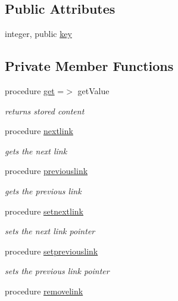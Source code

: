 \subsection*{Public Attributes}
\begin{DoxyCompactItemize}
\item 
integer, public \mbox{\hyperlink{structlink__mod_1_1link_a3f4862b7d40b8f01c7c65f85d1a567ef}{key}}
\end{DoxyCompactItemize}
\subsection*{Private Member Functions}
\begin{DoxyCompactItemize}
\item 
procedure \mbox{\hyperlink{structlink__mod_1_1link_ae93e1e4945ec20b860a1395707f5a3c2}{get}} =$>$ get\+Value
\begin{DoxyCompactList}\small\item\em returns stored content \end{DoxyCompactList}\item 
procedure \mbox{\hyperlink{structlink__mod_1_1link_adca80dab61624ba43b5069fca5cf7427}{nextlink}}
\begin{DoxyCompactList}\small\item\em gets the next link \end{DoxyCompactList}\item 
procedure \mbox{\hyperlink{structlink__mod_1_1link_a9f4742962c7a5ed17f103a037150e22b}{previouslink}}
\begin{DoxyCompactList}\small\item\em gets the previous link \end{DoxyCompactList}\item 
procedure \mbox{\hyperlink{structlink__mod_1_1link_a1cf24a9d0cfcd507358f7561b877d137}{setnextlink}}
\begin{DoxyCompactList}\small\item\em sets the next link pointer \end{DoxyCompactList}\item 
procedure \mbox{\hyperlink{structlink__mod_1_1link_aea2009bb7460c79ae58d5775b51ec45c}{setpreviouslink}}
\begin{DoxyCompactList}\small\item\em sets the previous link pointer \end{DoxyCompactList}\item 
procedure \mbox{\hyperlink{structlink__mod_1_1link_a35f43f3c1263afcc71cb129e1b0a5c52}{removelink}}
\end{DoxyCompactItemize}
